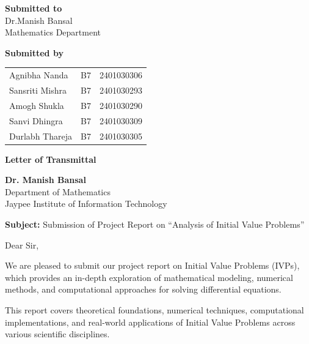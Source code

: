\documentclass[12pt,a4paper]{article}
\begin{document}
\begin{titlepage}
    \Large
    \textbf{Submitted to}\\
    Dr.Manish Bansal \\
    Mathematics Department\\
    \vspace{1cm}

    \textbf{Submitted by}
    \vspace{0.5cm}

    \begin{tabular}{lll}
        Agnibha Nanda & B7 & 2401030306 \\
        Sansriti Mishra & B7 & 2401030293 \\
        Amogh Shukla & B7 & 2401030290 \\
        Sanvi Dhingra & B7 & 2401030309 \\
        Durlabh Thareja & B7 & 2401030305 \\
    \end{tabular}

    \vspace*{\fill}
    \normalsize
\end{titlepage}

\begin{center}
    \Large\textbf{Letter of Transmittal}
\end{center}
\vspace{1cm}

\noindent
\textbf{Dr. Manish Bansal} \\
[0.5em]
Department of Mathematics \\
[0.5em]
Jaypee Institute of Information Technology \\
[0.5em]
\vspace{1cm}

\noindent
\textbf{Subject:} Submission of Project Report on ``Analysis of Initial Value Problems''

\vspace{1cm}

\noindent
Dear Sir,

\vspace{1em}

\noindent
We are pleased to submit our project report on Initial Value Problems (IVPs), which provides an in-depth exploration of mathematical modeling, numerical methods, and computational approaches for solving differential equations.

\vspace{1em}

\noindent
This report covers theoretical foundations, numerical techniques, computational implementations, and real-world applications of Initial Value Problems across various scientific disciplines.
\end{document}
